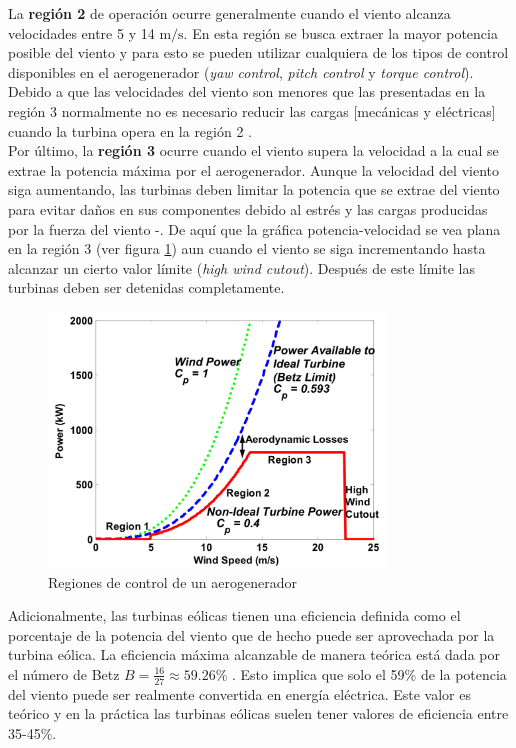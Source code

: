 {La \textbf{región 2} de operación ocurre generalmente cuando el viento alcanza velocidades entre 5 y 14 $\text{m}/\text{s}$. En esta región se busca extraer la mayor potencia posible del viento y para esto se pueden utilizar cualquiera de los tipos de control disponibles en el aerogenerador (\emph{yaw control}, \emph{pitch control} y \emph{torque control}). Debido a que las velocidades del viento son menores que las presentadas en la región 3 normalmente no es necesario reducir las cargas [mecánicas y eléctricas] cuando la turbina opera en la región 2 \cite{Johnson2004}.
\\

Por último, la \textbf{región 3} ocurre cuando el viento supera la velocidad a la cual se extrae la potencia máxima por el aerogenerador. Aunque la velocidad del viento siga aumentando, las turbinas deben limitar la potencia que se extrae del viento para evitar daños en sus componentes debido al estrés y las cargas producidas por la fuerza del viento \cite{Pao2009}-\cite{Johnson2004}. De aquí que la gráfica potencia-velocidad se vea plana en la región 3 (ver figura \ref{Regiones}) aun cuando el viento se siga incrementando hasta alcanzar un cierto valor límite (\emph{high wind cutout}). Después de este límite las turbinas deben ser detenidas completamente.
\\
\begin{figure}[H]
    \centering
    \includegraphics[width=0.8\textwidth]{Imagenes/Regions.jpeg}
    \caption{Regiones de control de un aerogenerador \cite{Johnson2004}}
    \label{Regiones}
\end{figure}

Adicionalmente, las turbinas eólicas tienen una eficiencia definida como el porcentaje de la potencia del viento que de hecho puede ser aprovechada por la turbina eólica. La eficiencia máxima alcanzable de manera teórica está dada por el número de Betz $B=\frac{16}{27}\approx 59.26$\% \cite{Huleihil2012}. Esto implica que solo el 59\% de la potencia del viento puede ser realmente convertida en energía eléctrica. Este valor es teórico y en la práctica las turbinas eólicas suelen tener valores de eficiencia entre 35-45\%.
}

